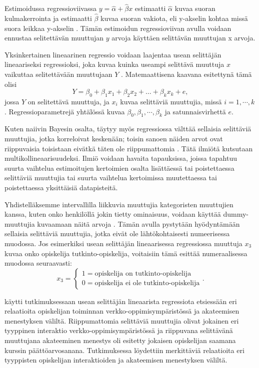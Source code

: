 Estimoidussa regressioviivassa $y = \hat{\alpha} + \hat{\beta}x$ estimaatti $\hat{\alpha}$ kuvaa suoran kulmakerrointa ja estimaatti $\hat{\beta}$ kuvaa suoran vakiota, eli y-akselin kohtaa missä suora leikkaa y-akselin \citep{rossIntroductoryStatistics2017}. Tämän estimoidun regressioviivan avulla voidaan ennustaa selitettävän muuttujan $y$ arvoja käyttäen selittävän muuttujan x arvoja.

Yksinkertainen lineaarinen regressio voidaan laajentaa usean selittäjän lineaariseksi regressioksi, joka kuvaa kuinka useampi selittävä muuttuja $x$ vaikuttaa selitettävään muuttujaan $Y$ \citep{rossIntroductoryStatistics2017}. Matemaattisena kaavana esitettynä tämä olisi $$Y = \beta_0 + \beta_1x_1 + \beta_2x_2 + \ldots + \beta_kx_k + e,$$ jossa $Y$ on selitettävä muuttuja, ja $x_i$ kuvaa selittäviä muuttujia, missä $i = 1, \cdots, k$. Regressioparametrejä yhtälössä kuvaa $\beta_0, \beta_1, \cdots, \beta_k$ ja satunnaisvirhettä $e$.

Kuten naiivin Bayesin osalta, täytyy myös regressiossa välttää sellaisia selittäviä muuttujia, jotka korreloivat keskenään; toisin sanoen näiden arvot ovat riippuvaisia toisistaan eivätkä täten ole riippumattomia \citep{daoudMulticollinearityRegressionAnalysis2017}. Tätä ilmiötä kutsutaan multikollineaarisuudeksi. Ilmiö voidaan havaita tapauksissa, joissa tapahtuu suurta vaihtelua estimoitujen kertoimien osalta lisättäessä tai poistettaessa selittäviä muuttujia tai suurta vaihtelua kertoimissa muutettaessa tai poistettaessa yksittäisiä datapisteitä.

Yhdistelläksemme intervallilla liikkuvia muuttujia kategoristen muuttujien kanssa, kuten onko henkilöllä jokin tietty ominaisuus, voidaan käyttää dummy-muuttujia kuvaamaan näitä arvoja \citep{rossIntroductoryStatistics2017}. Tämän avulla pystytään hyödyntämään sellaisia selittäviä muuttujia, jotka eivät ole lähtökohtaisesti numeerisessa muodossa. Jos esimerkiksi usean selittäjän lineaarisessa regressiossa muuttuja $x_3$ kuvaa onko opiskelija tutkinto-opiskelija, voitaisiin tämä esittää numeraalisessa muodossa seuraavasti: $$x_3 = \begin{cases}1 = \text{opiskelija on tutkinto-opiskelija} \\ 0 = \text{opiskelija ei ole tutkinto-opiskelija}\end{cases}.$$

\cite{agudo-peregrinaCanWePredict2014} käytti tutkimuksessaan usean selittäjän lineaarista regressiota etsiessään eri relaatioita opiskelijan toiminnan verkko-oppimisympäristössä ja akateemisen menestyksen väliltä. Riippumattomia selittäviä muuttujia olivat jokainen eri tyyppinen interaktio verkko-oppimisympäristössä ja riippuvana selittävänä muuttujana akateeminen menestys oli esitetty jokaisen opiskelijan saamana kurssin päättöarvosanana. Tutkimuksessa löydettiin merkittäviä relaatioita eri tyyppisten opiskelijan interaktioiden ja akateemisen menestyksen väliltä.

